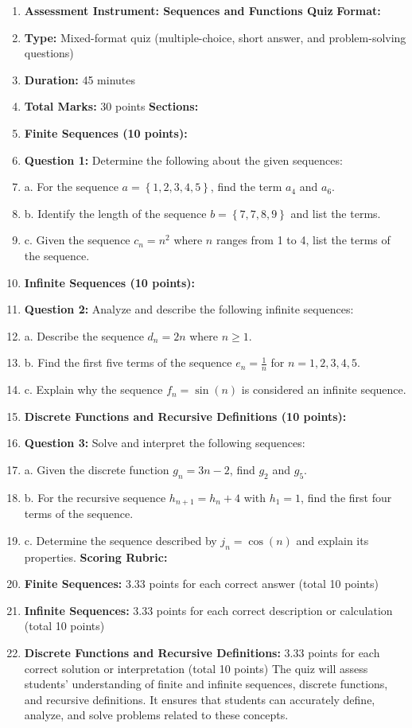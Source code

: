 \begin{enumerate}
    \item \textbf{Assessment Instrument: Sequences and Functions Quiz} \textbf{Format:}
    \item \textbf{Type:} Mixed-format quiz (multiple-choice, short answer, and problem-solving questions)
    \item \textbf{Duration:} 45 minutes
    \item \textbf{Total Marks:} 30 points \textbf{Sections:}
    \item \textbf{Finite Sequences (10 points):}
    \item \textbf{Question 1:} Determine the following about the given sequences:
    \item a. For the sequence $a = \left\{1, 2, 3, 4, 5\right\}$, find the term $a_4$ and $a_6$.
    \item b. Identify the length of the sequence $b = \left\{7, 7, 8, 9\right\}$ and list the terms.
    \item c. Given the sequence $c_n = n^2$ where $n$ ranges from 1 to 4, list the terms of the sequence.
    \item \textbf{Infinite Sequences (10 points):}
    \item \textbf{Question 2:} Analyze and describe the following infinite sequences:
    \item a. Describe the sequence $d_n = 2n$ where $n \geq 1$.
    \item b. Find the first five terms of the sequence $e_n = \frac{1}{n}$ for $n = 1, 2, 3, 4, 5$.
    \item c. Explain why the sequence $f_n = \sin(n)$ is considered an infinite sequence.
    \item \textbf{Discrete Functions and Recursive Definitions (10 points):}
    \item \textbf{Question 3:} Solve and interpret the following sequences:
    \item a. Given the discrete function $g_n = 3n - 2$, find $g_2$ and $g_5$.
    \item b. For the recursive sequence $h_{n+1} = h_n + 4$ with $h_1 = 1$, find the first four terms of the sequence.
    \item c. Determine the sequence described by $j_n = \cos(n)$ and explain its properties. \textbf{Scoring Rubric:}
    \item \textbf{Finite Sequences:} 3.33 points for each correct answer (total 10 points)
    \item \textbf{Infinite Sequences:} 3.33 points for each correct description or calculation (total 10 points)
    \item \textbf{Discrete Functions and Recursive Definitions:} 3.33 points for each correct solution or interpretation (total 10 points) The quiz will assess students' understanding of finite and infinite sequences, discrete functions, and recursive definitions. It ensures that students can accurately define, analyze, and solve problems related to these concepts.
\end{enumerate}

